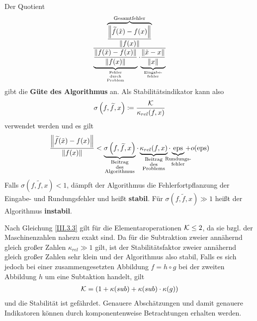 \begin{Beme}[Sprechweise]\label{3.3.8}
  Der Quotient 
  \begin{gather}
    \frac{\overbrace{\frac{\nn[\widetilde{f}(\tilde{x})-f(x)]}{\nn[f(x)]}}^{
        \text{Gesamtfehler}}}
    {\underbrace{\frac{\nn[f(\tilde{x})-f(x)]}{\nn[f(x)]}}_{
        \scriptsize\substack{
          \text{Fehler} \\
          \text{durch} \\
          \text{Problem}
        }}
      \cdot
      {\underbrace{\frac{\nn[\tilde{x}-x]}{\nn[x]}}_{
          \scriptsize\substack{\text{Eingabe-} \\ \text{fehler}}}}}
    \label{III.3.6}
  \end{gather}
  gibt die \textbf{Güte des Algorithmus}  an.
  Als Stabilitätsindikator kann also 
  \begin{gather}
    \sigma\left(f, \widetilde{f}, x\right) \coloneqq \frac{\K}{\kappa_{rel}(f, x)}
    \label{III.3.7}
  \end{gather}
  verwendet werden und es gilt
  \begin{gather*}
    \frac{\nn[\widetilde{f}(\tilde{x})-f(x)]}{\nn[f(x)]}
    < \underbrace{\sigma\left( f,\widetilde{f}, x\right) }_{
      \mathclap{\substack{\text{Beitrag}\\
        \text{des} \\
        \text{Algorithmus}}}}
    \cdot \underbrace{\kappa_{rel}(f,x)}_{
      \mathclap{\substack{\text{Beitrag} \\
        \text{des} \\
        \text{Problems}}}}
    \cdot \underbrace{\Eps}_{\mathclap{\substack{\text{Rundungs-}\\\text{fehler}}}}
    + o(\Eps)
  \end{gather*}
  Falls $\sigma( f,\widetilde{f}, x)  < 1$, dämpft der Algorithmus die
  Fehlerfortpflanzung der Eingabe- und Rundungsfehler 
  und heißt \textbf{stabil}.
  Für $\sigma(f,\widetilde{f},x)\gg 1$ heißt der Algorithmus \textbf{instabil}.
\end{Beme}



\begin{Bspe}
  Nach Gleichung \eqref{III.3.3} gilt für die Elementaroperationen
  $\mathcal{K}\leq 2$, da sie bzgl. der Maschinenzahlen nahezu exakt sind.
  Da für die Subtraktion zweier annähernd 
  gleich großer Zahlen $\kappa_{rel}\gg 1$ gilt,
  ist der Stabilitätsfaktor zweier annähernd gleich großer
  Zahlen sehr klein und der Algorithmus also stabil,
  Falls es sich jedoch bei einer zusammengesetzten Abbildung $f=h\circ g$
  bei der zweiten Abbildung $h$ um eine Subtaktion handelt, gilt
  \begin{gather*}
    \mathcal{K} =(1+\kappa(sub)+\kappa(sub)\cdot\kappa(g))
  \end{gather*}
  und die Stabilität ist gefährdet.
  Genauere Abschätzungen und damit genauere Indikatoren
  können durch komponentenweise Betrachtungen erhalten werden.
\end{Bspe}



